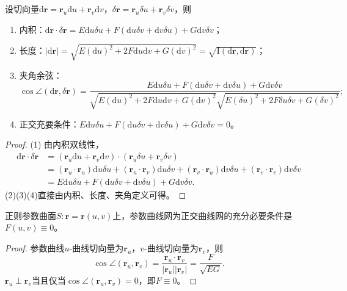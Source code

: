 \documentclass[../../main.tex]{subfiles}%
\begin{document}
\begin{proposition}
设切向量$\mathrm{d}\boldsymbol{r}=\boldsymbol{r}_u\mathrm{d}u+\boldsymbol{r}_v\mathrm{d}v$，$\delta\boldsymbol{r}=\boldsymbol{r}_u\delta u+\boldsymbol{r}_v\delta v$，则
\begin{enumerate}[(1)]
\item 内积：$\mathrm{d}\boldsymbol{r}\cdot\delta\boldsymbol{r}=E\mathrm{d}u\delta u+F(\mathrm{d}u\delta v+\mathrm{d}v\delta u)+G\mathrm{d}v\delta v$；
\item 长度：$|\mathrm{d}\boldsymbol{r}|=\sqrt{E(\mathrm{d}u)^2+2F\mathrm{d}u\mathrm{d}v+G(\mathrm{d}v)^2}=\sqrt{\mathrm{I}(\mathrm{d}\boldsymbol{r},\mathrm{d}\boldsymbol{r})}$；
\item 夹角余弦：
\[
\cos\angle(\mathrm{d}\boldsymbol{r},\delta\boldsymbol{r})=\frac{E\mathrm{d}u\delta u+F(\mathrm{d}u\delta v+\mathrm{d}v\delta u)+G\mathrm{d}v\delta v}{\sqrt{E(\mathrm{d}u)^2+2F\mathrm{d}u\mathrm{d}v+G(\mathrm{d}v)^2}\sqrt{E(\delta u)^2+2F\delta u\delta v+G(\delta v)^2}};
\]
\item 正交充要条件：$E\mathrm{d}u\delta u+F(\mathrm{d}u\delta v+\mathrm{d}v\delta u)+G\mathrm{d}v\delta v=0$。
\end{enumerate}
\end{proposition}
\begin{proof}

(1) 由内积双线性，
\begin{align*}
\mathrm{d}\boldsymbol{r}\cdot\delta\boldsymbol{r}
&=(\boldsymbol{r}_u\mathrm{d}u+\boldsymbol{r}_v\mathrm{d}v)\cdot(\boldsymbol{r}_u\delta u+\boldsymbol{r}_v\delta v)\\
&=(\boldsymbol{r}_u\cdot\boldsymbol{r}_u)\mathrm{d}u\delta u+(\boldsymbol{r}_u\cdot\boldsymbol{r}_v)\mathrm{d}u\delta v+(\boldsymbol{r}_v\cdot\boldsymbol{r}_u)\mathrm{d}v\delta u+(\boldsymbol{r}_v\cdot\boldsymbol{r}_v)\mathrm{d}v\delta v\\
&=E\mathrm{d}u\delta u+F(\mathrm{d}u\delta v+\mathrm{d}v\delta u)+G\mathrm{d}v\delta v.
\end{align*}
(2)(3)(4)直接由内积、长度、夹角定义可得。

\end{proof}

\begin{theorem}
正则参数曲面$S:\boldsymbol{r}=\boldsymbol{r}(u,v)$上，参数曲线网为正交曲线网的充分必要条件是$F(u,v)\equiv0$。
\end{theorem}
\begin{proof}

参数曲线$u$-曲线切向量为$\boldsymbol{r}_u$，$v$-曲线切向量为$\boldsymbol{r}_v$，则
\[
\cos\angle(\boldsymbol{r}_u,\boldsymbol{r}_v)=\frac{\boldsymbol{r}_u\cdot\boldsymbol{r}_v}{|\boldsymbol{r}_u||\boldsymbol{r}_v|}=\frac{F}{\sqrt{EG}}.
\]
$\boldsymbol{r}_u\perp\boldsymbol{r}_v$当且仅当$\cos\angle(\boldsymbol{r}_u,\boldsymbol{r}_v)=0$，即$F\equiv0$。

\end{proof}
\end{document}
